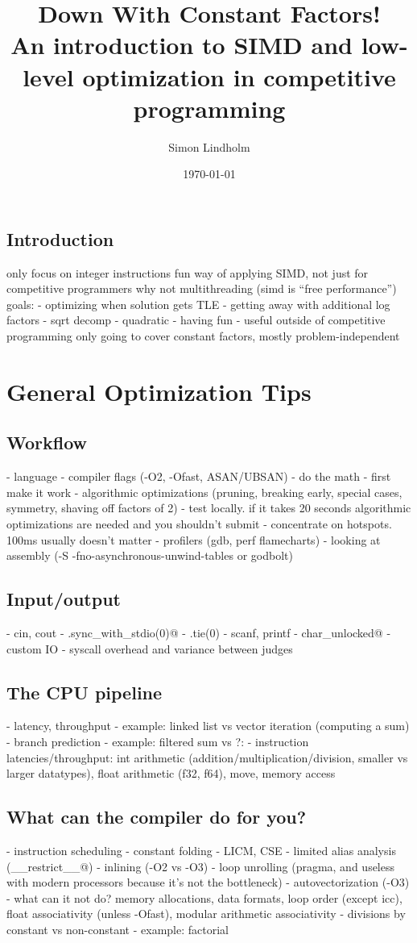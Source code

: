 \documentclass[openany]{book}
\title{
    Down With Constant Factors! \\
    \large An introduction to SIMD and low-level optimization in competitive programming
}
\author{Simon Lindholm}
\date{\today}
\begin{document}
\maketitle

\tableofcontents

\chapter{Introduction}
only focus on integer instructions
fun way of applying SIMD, not just for competitive programmers
why not multithreading (simd is ``free performance'')
goals:
- optimizing when solution gets TLE
- getting away with additional log factors
- sqrt decomp
- quadratic
- having fun
- useful outside of competitive programming
only going to cover constant factors, mostly problem-independent

\part{General Optimization Tips}
\chapter{Workflow}
- language
- compiler flags (-O2, -Ofast, ASAN/UBSAN)
- do the math
- first make it work
- algorithmic optimizations (pruning, breaking early, special cases, symmetry, shaving off factors of 2)
- test locally. if it takes 20 seconds algorithmic optimizations are needed and you shouldn't submit
- concentrate on hotspots. 100ms usually doesn't matter
- profilers (gdb, perf flamecharts)
- looking at assembly (-S -fno-asynchronous-unwind-tables or godbolt)
\chapter{Input/output}
- cin, cout
- \verb@.sync_with_stdio(0)@
- .tie(0)
- scanf, printf
- char_unlocked@
- custom IO
- syscall overhead and variance between judges
\chapter{The CPU pipeline}
- latency, throughput
- example: linked list vs vector iteration (computing a sum)
- branch prediction
- example: filtered sum vs ?:
- instruction latencies/throughput: int arithmetic (addition/multiplication/division, smaller vs larger datatypes), float arithmetic (f32, f64), move, memory access
\chapter{What can the compiler do for you?}
- instruction scheduling
- constant folding
- LICM, CSE
- limited alias analysis (\verb@__restrict__@)
- inlining (-O2 vs -O3)
- loop unrolling (pragma, and useless with modern processors because it's not the bottleneck)
- autovectorization (-O3)
- what can it not do? memory allocations, data formats, loop order (except icc), float associativity (unless -Ofast), modular arithmetic associativity
- divisions by constant vs non-constant
- example: factorial
\end{document}

